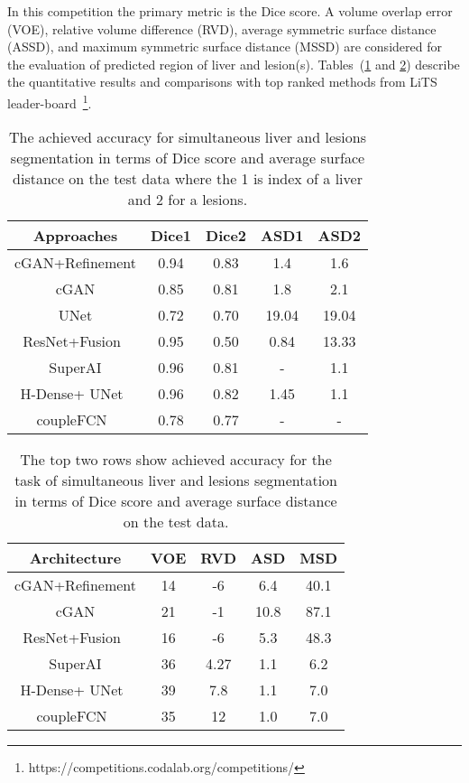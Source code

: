 \documentclass[10pt,twocolumn,letterpaper]{article}
\begin{document}
In this competition the primary metric is the Dice score. A volume overlap error (VOE), relative volume difference (RVD), average symmetric surface distance (ASSD), and maximum symmetric surface distance (MSSD) are considered for the evaluation of predicted region of liver and lesion(s). Tables~(\ref{dice_asd_liver} and \ref{ourmertricliver}) describe the quantitative results and comparisons with top ranked methods from LiTS leader-board~\footnote{https://competitions.codalab.org/competitions/}.

\begin{table}[!htbp]
\centering
\caption{The achieved accuracy for simultaneous liver and lesions segmentation in terms of Dice score and average surface distance on the test data where the 1 is index of a liver and 2 for a lesions.}
\begin{tabular}{*5c}
\toprule
Approaches & Dice1  & Dice2 & ASD1 & ASD2 \\
\midrule
cGAN+Refinement   &  0.94 & 0.83  & 1.4 & 1.6 \\
cGAN   &  0.85 & 0.81  & 1.8  &  2.1  \\
UNet   &  0.72 & 0.70  & 19.04  &  19.04    \\
ResNet+Fusion~\cite{BiKKF17} & 0.95 & 0.50  & 0.84 &  13.33  \\
SuperAI & 0.96  & 0.81  & -  &  1.1   \\
H-Dense+ UNet~\cite{Han17a} &  0.96 & 0.82  & 1.45  & 1.1    \\
coupleFCN~\cite{VorontsovCTPK17} &  0.78 & 0.77  & -  &  -    \\
\bottomrule
\end{tabular}
\label{dice_asd_liver}
\end{table}\begin{table}[!htbp]
\centering
\caption{The top two rows show achieved accuracy for the task of simultaneous liver and lesions segmentation in terms of Dice score and average surface distance on the test data.}
\begin{tabular}{*5c}
\toprule
Architecture & VOE  & RVD & ASD & MSD \\
\midrule
cGAN+Refinement   &  14 & -6  & 6.4 & 40.1 \\
cGAN   &  21 & -1  & 10.8  &  87.1  \\
ResNet+Fusion~\cite{BiKKF17} & 16 & -6  & 5.3 &  48.3 \\
SuperAI & 36 & 4.27  & 1.1 &  6.2 \\
H-Dense+ UNet~\cite{Han17a} &  39 & 7.8  & 1.1 &  7.0 \\
coupleFCN~\cite{VorontsovCTPK17} & 35 & 12  & 1.0 &  7.0 \\
\bottomrule
\end{tabular}
\label{ourmertricliver}
\end{table}
\end{document}
